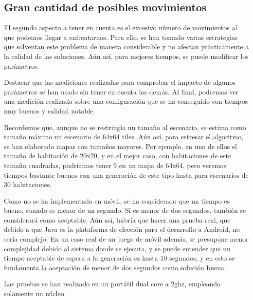 \subsection{Gran cantidad de posibles movimientos}

El segundo aspecto a tener en cuenta es el excesivo número de movimientos al que podemos llegar a enfrentarnos. Para ello, se han tomado varias estrategias que solventan este problema de manera considerable y no afectan prácticamente a la calidad de las soluciones. Aún así, para mejores tiempos, se puede modificar los parámetros.

Destacar que las mediciones realizadas para comprobar el impacto de algunos parámetros se han usado sin tener en cuenta los demás. Al final, podremos ver una medición realizada sobre una configuración que se ha conseguido con tiempos muy buenos y calidad notable.

Recordemos que, aunque no se restringía un tamaño al escenario, se estima como tamaño máximo un escenario de 64x64 tiles. Aún así, para estresar el algoritmo, se han elaborado mapas con tamaños mayores. Por ejemplo, en uno de ellos el tamaño de habitación de 20x20, y en el mejor caso, con habitaciones de este tamaño cuadradas, podríamos tener 9 en un mapa de 64x64, pero veremos tiempos bastante buenos con una generación de este tipo hasta para escenarios de 30 habitaciones.

Como no se ha implementado en móvil, se ha considerado que un tiempo es bueno, cuando es menor de un segundo. Si es menor de dos segundos, también se considerará como aceptable. Aún así, habría que hacer una prueba real, que debido a que Java es la plataforma de elección para el desarrollo a Android, no sería complejo. En un caso real de un juego de móvil además, se presupone menor complejidad debido al sistema donde se ejecuta, y se puede entender que un tiempo aceptable de espera a la generación es hasta 10 segundos, y en esto se fundamenta la aceptación de menor de dos segundos como solución buena.

Las pruebas se han realizado en un portátil dual core a 2ghz, empleando solamente un núcleo.

